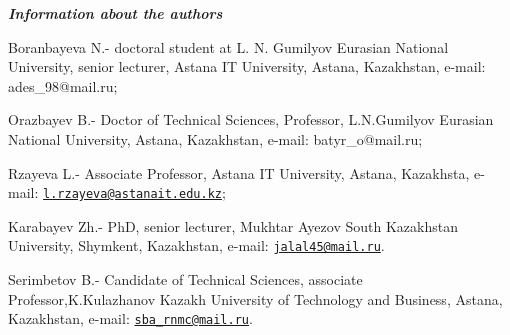 \emph{{\bfseries Information about the authors}}

Boranbayeva N.- doctoral student at L. N. Gumilyov Eurasian National
University, senior lecturer, Astana IT University, Astana, Kazakhstan,
e-mail: ades\_98@mail.ru;

Orazbayev B.- Doctor of Technical Sciences, Professor, L.N.Gumilyov
Eurasian National University, Astana, Kazakhstan, e-mail:
batyr\_o@mail.ru;

Rzayeva L.- Associate Professor, Astana IT University, Astana,
Kazakhsta, e-mail:
\href{mailto:l.rzayeva@astanait.edu.kz}{\nolinkurl{l.rzayeva@astanait.edu.kz}};

Karabayev Zh.- PhD, senior lecturer, Mukhtar Ayezov South Kazakhstan
University, Shymkent, Kazakhstan, e-mail:
\href{mailto:jalal45@mail.ru}{\nolinkurl{jalal45@mail.ru}}.

Serimbetov B.- Candidate of Technical Sciences, associate
Professor,K.Kulazhanov Kazakh University of Technology and Business,
Astana, Kazakhstan, e-mail:
\href{mailto:sba_rnmc@mail.ru}{\nolinkurl{sba\_rnmc@mail.ru}}.